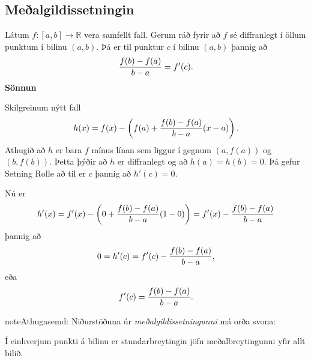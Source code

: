 \documentclass[b5paper,10pt,icelandic]{sphinxmanual}
\begin{document}

\subsection{Meðalgildissetningin}
\label{kafli03:index-7}\label{kafli03:id13}
Látum \(f:[a,b]\rightarrow{{\mathbb  R}}\) vera samfellt fall. Gerum
ráð fyrir að \(f\) sé diffranlegt í öllum punktum í bilinu
\((a,b)\). Þá er til punktur \(c\) í bilinu \((a,b)\) þannig
að
\begin{gather}
\begin{split}\frac{f(b)-f(a)}{b-a}=f'(c).\end{split}\notag
\end{gather}
\textbf{Sönnun}

Skilgreinum nýtt fall
\begin{gather}
\begin{split}h(x)=f(x)-\left(f(a)+ \frac{f(b)-f(a)}{b-a}(x-a)\right).\end{split}\notag
\end{gather}
Athugið að \(h\) er bara \(f\) mínus línan sem liggur í gegnum
\((a,f(a))\) og \((b,f(b))\). Þetta þýðir að \(h\) er diffranlegt
og að \(h(a)=h(b)=0\). Þá gefur Setning Rolle að til er \(c\) þannig að
\(h'(c)=0\).

Nú er
\begin{gather}
\begin{split}h'(x) = f'(x) - \left(0+\frac{f(b)-f(a)}{b-a}(1-0)\right)
= f'(x) - \frac{f(b)-f(a)}{b-a}\end{split}\notag
\end{gather}
þannig að
\begin{gather}
\begin{split}0 = h'(c) = f'(c) - \frac{f(b)-f(a)}{b-a},\end{split}\notag
\end{gather}
eða
\begin{gather}
\begin{split}f'(c) = \frac{f(b)-f(a)}{b-a}.\end{split}\notag
\end{gather}
\begin{notice}{note}{Athugasemd:}
Niðurstöðuna úr \textit{meðalgildissetningunni} má orða svona:

Í einhverjum punkti á bilinu er stundarbreytingin jöfn meðalbreytingunni
yfir allt bilið.
\end{notice}

\end{document}
